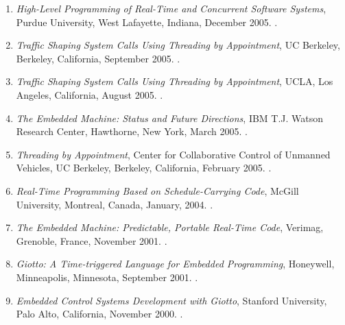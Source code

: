 {\begin{enumerate}
\item \emph{High-Level Programming of Real-Time and Concurrent Software Systems},
Purdue University, West Lafayette, Indiana, December 2005.
.

\item \emph{Traffic Shaping System Calls Using Threading by Appointment},
UC Berkeley, Berkeley, California, September 2005.
.

\item \emph{Traffic Shaping System Calls Using Threading by Appointment},
UCLA, Los Angeles, California, August 2005.
.

\item \emph{The Embedded Machine: Status and Future Directions},
IBM T.J. Watson Research Center, Hawthorne, New York, March 2005.
.

\item \emph{Threading by Appointment},
Center for Collaborative Control of Unmanned Vehicles, UC Berkeley, Berkeley, California, February 2005.
.

\item \emph{Real-Time Programming Based on Schedule-Carrying Code},
McGill University, Montreal, Canada, January, 2004.
.

\item \emph{The Embedded Machine: Predictable, Portable Real-Time Code},
Verimag, Grenoble, France, November 2001.
.

\item \emph{Giotto: A Time-triggered Language for Embedded Programming},
Honeywell, Minneapolis, Minnesota, September 2001.
.

\item \emph{Embedded Control Systems Development with Giotto},
Stanford University, Palo Alto, California, November 2000.
.
\end{enumerate}
}
